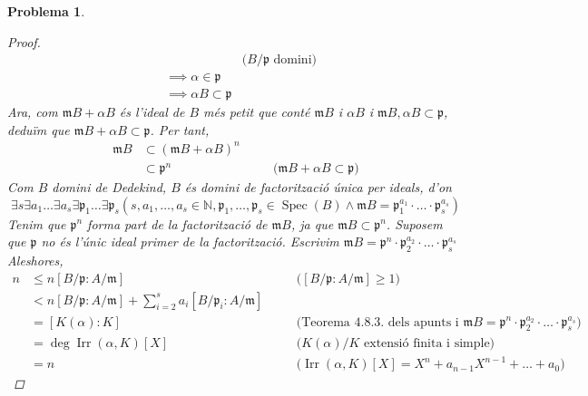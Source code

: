 \documentclass{article}
\DeclareMathOperator{\Irr}{Irr}
\DeclareMathOperator{\Spec}{Spec}
\newtheorem{problema}{Problema}
\begin{document}
\begin{problema}
\begin{enumerate}
\begin{proof}
\begin{align*}
                &\quad&\textrm{($B/\mathfrak{p}$ domini)}\\
                &\implies\alpha\in\mathfrak{p}\\
                &\implies\alpha B\subset\mathfrak{p}
            \end{align*}
            Ara, com $\mathfrak{m}B+\alpha B$ és l'ideal de $B$ més petit que conté $\mathfrak{m}B$ i $\alpha B$ i $\mathfrak{m}B,\alpha B\subset\mathfrak{p}$, deduïm que $\mathfrak{m}B+\alpha B\subset\mathfrak{p}$. Per tant,
            \begin{align*}
                \mathfrak{m}B
                &\subset(\mathfrak{m}B+\alpha B)^{n}\\
                &\subset\mathfrak{p}^{n}
                &\quad&\textrm{($\mathfrak{m}B+\alpha B\subset\mathfrak{p}$)}
            \end{align*}
            Com $B$ domini de Dedekind, $B$ és domini de factorització única per ideals, d'on
            \begin{equation*}
                \exists s\exists a_{1}\ldots\exists a_{s}\exists\mathfrak{p}_{1}\ldots\exists\mathfrak{p}_{s}(s,a_{1},\ldots,a_{s}\in\mathbb{N},\mathfrak{p}_{1},\ldots,\mathfrak{p}_{s}\in\Spec(B)\land\mathfrak{m}B=\mathfrak{p}_{1}^{a_{1}}\cdot\ldots\cdot\mathfrak{p}_{s}^{a_{s}})
            \end{equation*}
            Tenim que $\mathfrak{p}^{n}$ forma part de la factorització de $\mathfrak{m}B$, ja que $\mathfrak{m}B\subset\mathfrak{p}^{n}$. Suposem que $\mathfrak{p}$ no és l'únic ideal primer de la factorització. Escrivim $\mathfrak{m}B=\mathfrak{p}^{n}\cdot\mathfrak{p}_{2}^{a_{2}}\cdot\ldots\cdot\mathfrak{p}_{s}^{a_{s}}$ Aleshores,
            \begin{align*}
                n
                &\leq n[B/\mathfrak{p}:A/\mathfrak{m}]
                &\quad&\textrm{($[B/\mathfrak{p}:A/\mathfrak{m}]\geq1$)}\\
                &<n[B/\mathfrak{p}:A/\mathfrak{m}]+\sum_{i=2}^{s}a_{i}[B/\mathfrak{p}_{i}:A/\mathfrak{m}]\\
                &=[K(\alpha):K]
                &\quad&\textrm{(Teorema 4.8.3. dels apunts i $\mathfrak{m}B=\mathfrak{p}^{n}\cdot\mathfrak{p}_{2}^{a_{2}}\cdot\ldots\cdot\mathfrak{p}_{s}^{a_{s}}$)}\\
                &=\deg{\Irr(\alpha,K)[X]}
                &\quad&\textrm{($K(\alpha)/K$ extensió finita i simple)}\\
                &=n
                &\quad&\textrm{($\Irr(\alpha,K)[X]=X^{n}+a_{n-1}X^{n-1}+\ldots+a_{0}$)}

\end{align*}
\end{proof}
\end{enumerate}
\end{problema}
\end{document}
